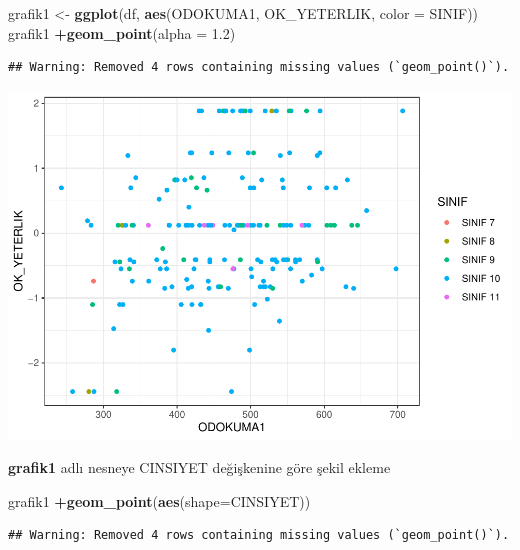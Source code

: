 \documentclass[
  oneside]{book}
\newenvironment{Shaded}{\begin{snugshade}}{\end{snugshade}}
\newcommand{\AttributeTok}[1]{\textcolor[rgb]{0.13,0.29,0.53}{#1}}
\newcommand{\FloatTok}[1]{\textcolor[rgb]{0.00,0.00,0.81}{#1}}
\newcommand{\FunctionTok}[1]{\textcolor[rgb]{0.13,0.29,0.53}{\textbf{#1}}}
\newcommand{\NormalTok}[1]{#1}
\newcommand{\OtherTok}[1]{\textcolor[rgb]{0.56,0.35,0.01}{#1}}
\newcommand{\SpecialCharTok}[1]{\textcolor[rgb]{0.81,0.36,0.00}{\textbf{#1}}}
\begin{document}
\begin{Shaded}
\begin{Highlighting}[]
\NormalTok{grafik1 }\OtherTok{\textless{}{-}} \FunctionTok{ggplot}\NormalTok{(df, }\FunctionTok{aes}\NormalTok{(ODOKUMA1, OK\_YETERLIK, }\AttributeTok{color =}\NormalTok{ SINIF))}
\NormalTok{grafik1 }\SpecialCharTok{+}\FunctionTok{geom\_point}\NormalTok{(}\AttributeTok{alpha =} \FloatTok{1.2}\NormalTok{)}
\end{Highlighting}
\end{Shaded}

\begin{verbatim}
## Warning: Removed 4 rows containing missing values (`geom_point()`).
\end{verbatim}

\begin{center}\includegraphics[width=1\linewidth]{15-betimleyici-istatistik_files/figure-latex/unnamed-chunk-48-1} \end{center}

\textbf{grafik1} adlı nesneye CINSIYET değişkenine göre şekil ekleme

\begin{Shaded}
\begin{Highlighting}[]
\NormalTok{grafik1 }\SpecialCharTok{+}\FunctionTok{geom\_point}\NormalTok{(}\FunctionTok{aes}\NormalTok{(}\AttributeTok{shape=}\NormalTok{CINSIYET))}
\end{Highlighting}
\end{Shaded}

\begin{verbatim}
## Warning: Removed 4 rows containing missing values (`geom_point()`).
\end{verbatim}
\end{document}
